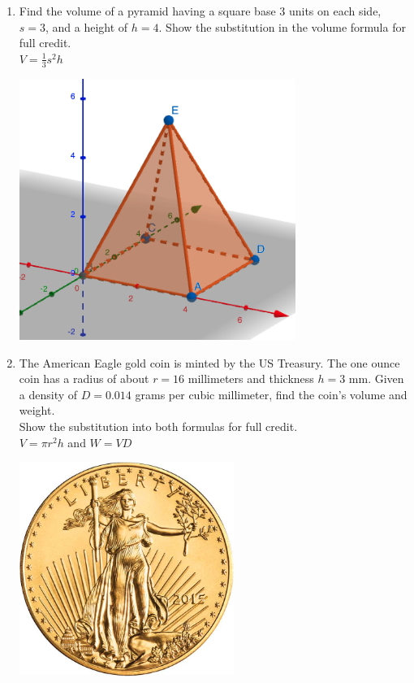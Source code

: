 \begin{enumerate}
\item Find the volume of a pyramid having a square base 3 units on each side, $s=3$, and a height of $h=4$. Show the substitution in the volume formula for full credit. \\[0.5cm]
$\displaystyle V = \frac{1}{3} s^2 h$
  \begin{flushright}
    \includegraphics[width=9cm]{../graphics/04pyramid.png}
  \end{flushright}

\item The American Eagle gold coin is minted by the US Treasury. The one ounce coin has a radius of about $r=16$ millimeters and thickness $h=3$ mm. Given a density of $D = 0.014$ grams per cubic millimeter, find the coin's volume and weight. \\[0.25cm]
Show the substitution into both formulas for full credit.\\[0.5cm]
$\displaystyle V = \pi r^2 h$ and $W=VD$
  \begin{flushright}
    \includegraphics[width=7cm]{../graphics/04bcoin.png}
  \end{flushright}
  

\end{enumerate}
